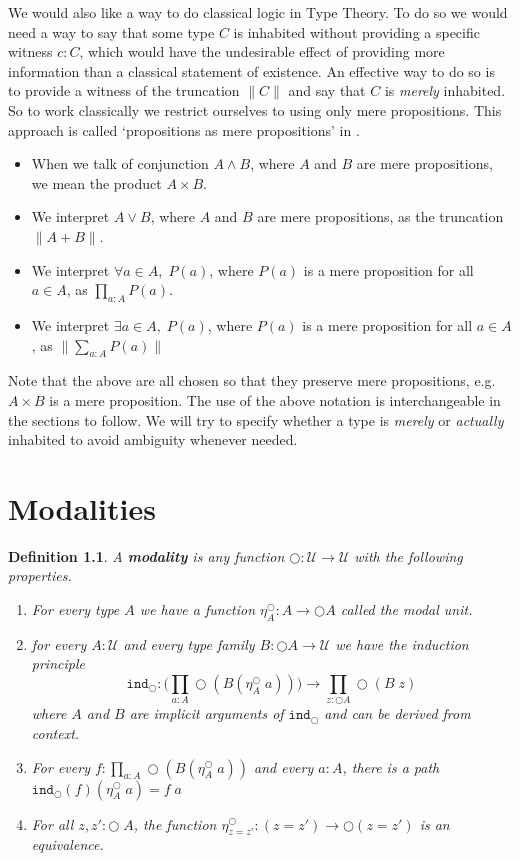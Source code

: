 \documentclass[12pt]{report}
\newtheorem{defn}[thm]{Definition}
\begin{document}
We would also like a way to do classical logic in Type Theory. 
To do so we would need a way to say that some type $C$ is inhabited without providing a specific witness $c : C$, which would have the undesirable effect of providing more information than a classical statement of existence. 
An effective way to do so is to provide a witness of the truncation $\lVert C \rVert$ and say that $C$ is \textit{merely} inhabited. 
So to work classically we restrict ourselves to using only mere propositions. 
This approach is called `propositions as mere propositions' in \cite{hottbook}. 
\begin{itemize}
\item When we talk of conjunction $A \wedge B$, where $A$ and $B$ are mere propositions, we mean the product $A \times B$. 
\item We interpret $A \vee B$, where $A$ and $B$ are mere propositions, as the truncation $\| A + B\|$.
\item We interpret $\forall a\in A,\; P(a)$, where $P(a)$ is a mere proposition for all $a \in A$, as $\prod_{a : A}P(a)$. 
\item We interpret $ \exists a \in A,\; P(a)$, where $P(a)$ is a mere proposition for all $a \in A$, as $\| \sum_{a : A} P(a) \|$
\end{itemize}
Note that the above are all chosen so that they preserve mere propositions, e.g. $A\times B$ is a mere proposition. 
The use of the above notation is interchangeable in the sections to follow. 
We will try to specify whether a type is \textit{merely} or \textit{actually} inhabited to avoid ambiguity whenever needed. 

\chapter{Modalities}
\begin{defn}\label{modality_definition}
A \textbf{modality} is any function $\bigcirc : \mathcal{U} \rightarrow \mathcal{U}$ with the following properties.
\begin{enumerate}
	\item For every type $A$ we have a function $\eta_A^\bigcirc : A \rightarrow \bigcirc A$ called the modal unit.
	\item for every $A : \mathcal{U}$ and every type family $B : \bigcirc A \rightarrow \mathcal{U}$ we have the induction principle
	$$\mathtt{ind}_\bigcirc : \Big( \prod_{a : A}\bigcirc (B (\eta_A^\bigcirc\; a)) \Big) \rightarrow \prod_{z : \bigcirc A} \bigcirc (B\; z)$$
	where $A$ and $B$ are implicit arguments of $\mathtt{ind}_\bigcirc$ and can be derived from context. 
	\item For every $f : \prod_{a : A} \bigcirc (B(\eta_A^\bigcirc\; a))$ and every $a : A$, there is a path $\mathtt{ind}_\bigcirc (f)(\eta_A^\bigcirc\; a) = f\; a$
	\item For all $z,z' : \bigcirc \; A$, the function $\eta_{z=z'}^\bigcirc : (z = z') \rightarrow \bigcirc (z = z')$ is an equivalence.
\end{enumerate}
\end{defn}
\end{document}
